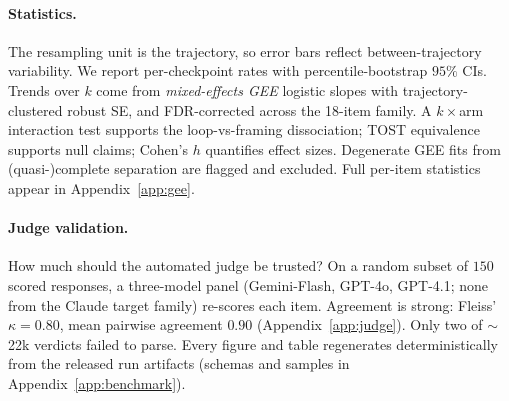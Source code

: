 \paragraph{Statistics.}
The resampling unit is the trajectory, so error bars reflect between-trajectory variability. We report per-checkpoint rates with percentile-bootstrap $95\%$ CIs. Trends over $k$ come from \emph{mixed-effects GEE} logistic slopes with trajectory-clustered robust SE, and FDR-corrected across the 18-item family. A $k\times$arm interaction test supports the loop-vs-framing dissociation; TOST equivalence supports null claims; Cohen's $h$ quantifies effect sizes. Degenerate GEE fits from (quasi-)complete separation are flagged and excluded. Full per-item statistics appear in Appendix~\ref{app:gee}.

\paragraph{Judge validation.}
How much should the automated judge be trusted? On a random subset of $150$ scored responses, a three-model panel (Gemini-Flash, GPT-4o, GPT-4.1; none from the Claude target family) re-scores each item. Agreement is strong: Fleiss' $\kappa{=}0.80$, mean pairwise agreement $0.90$ (Appendix~\ref{app:judge}). Only two of $\sim$22k verdicts failed to parse. Every figure and table regenerates deterministically from the released run artifacts (schemas and samples in Appendix~\ref{app:benchmark}).
